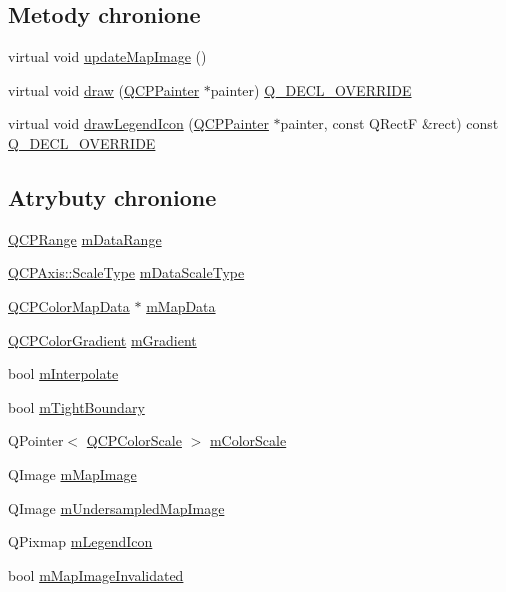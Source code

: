 \subsection*{Metody chronione}
\begin{DoxyCompactItemize}
\item 
virtual void \hyperlink{class_q_c_p_color_map_a5efcea591bb5486d968af520a4d43c3a}{update\+Map\+Image} ()
\item 
virtual void \hyperlink{class_q_c_p_color_map_a6b628014d2939368935efd0a788648c8}{draw} (\hyperlink{class_q_c_p_painter}{Q\+C\+P\+Painter} $\ast$painter) \hyperlink{qcustomplot_8hh_a42cc5eaeb25b85f8b52d2a4b94c56f55}{Q\+\_\+\+D\+E\+C\+L\+\_\+\+O\+V\+E\+R\+R\+I\+DE}
\item 
virtual void \hyperlink{class_q_c_p_color_map_adeaa5e262a03b7f021bd1aa6f1e60ce9}{draw\+Legend\+Icon} (\hyperlink{class_q_c_p_painter}{Q\+C\+P\+Painter} $\ast$painter, const Q\+RectF \&rect) const \hyperlink{qcustomplot_8hh_a42cc5eaeb25b85f8b52d2a4b94c56f55}{Q\+\_\+\+D\+E\+C\+L\+\_\+\+O\+V\+E\+R\+R\+I\+DE}
\end{DoxyCompactItemize}
\subsection*{Atrybuty chronione}
\begin{DoxyCompactItemize}
\item 
\hyperlink{class_q_c_p_range}{Q\+C\+P\+Range} \hyperlink{class_q_c_p_color_map_ab87609621d16cd3e9d52ad070b327b08}{m\+Data\+Range}
\item 
\hyperlink{class_q_c_p_axis_a36d8e8658dbaa179bf2aeb973db2d6f0}{Q\+C\+P\+Axis\+::\+Scale\+Type} \hyperlink{class_q_c_p_color_map_ab28a4b2def408f83b9818799d5f18446}{m\+Data\+Scale\+Type}
\item 
\hyperlink{class_q_c_p_color_map_data}{Q\+C\+P\+Color\+Map\+Data} $\ast$ \hyperlink{class_q_c_p_color_map_a8709272aa8f0be3ca111bf3866806f8b}{m\+Map\+Data}
\item 
\hyperlink{class_q_c_p_color_gradient}{Q\+C\+P\+Color\+Gradient} \hyperlink{class_q_c_p_color_map_aab77fe9a8df6f0486ab3507cc5f278fa}{m\+Gradient}
\item 
bool \hyperlink{class_q_c_p_color_map_af77e5eba9a844592648edeb6fbe834f1}{m\+Interpolate}
\item 
bool \hyperlink{class_q_c_p_color_map_ac2e9425fe4381b496726e1c09f978302}{m\+Tight\+Boundary}
\item 
Q\+Pointer$<$ \hyperlink{class_q_c_p_color_scale}{Q\+C\+P\+Color\+Scale} $>$ \hyperlink{class_q_c_p_color_map_a95b4100bacc3387652c988b071ec9db7}{m\+Color\+Scale}
\item 
Q\+Image \hyperlink{class_q_c_p_color_map_a66110813b42eca78b64095b2a1f285a0}{m\+Map\+Image}
\item 
Q\+Image \hyperlink{class_q_c_p_color_map_acad3d52f3572436d5f2e4057911ea8d3}{m\+Undersampled\+Map\+Image}
\item 
Q\+Pixmap \hyperlink{class_q_c_p_color_map_ada522988db02cb531767d38c5029ef60}{m\+Legend\+Icon}
\item 
bool \hyperlink{class_q_c_p_color_map_ac9aea6a5c193d7fa866bc7b26e79ef2c}{m\+Map\+Image\+Invalidated}
\end{DoxyCompactItemize}
